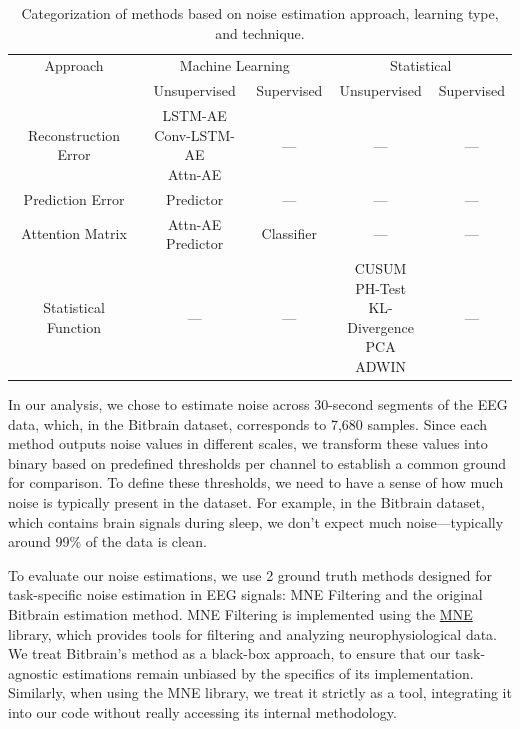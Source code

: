 \begin{table}[ht]
    \renewcommand{\arraystretch}{1.5}
    \setlength{\tabcolsep}{12pt}
    \centering
    \caption{Categorization of methods based on noise estimation approach, learning type, and technique.}
    \begin{tabular}{|c|c|c|c|c|}
    \hline
    Approach & \multicolumn{2}{c|}{Machine Learning} & \multicolumn{2}{c|}{Statistical} \\ \cline{2-5} 
             & Unsupervised & Supervised & Unsupervised & Supervised \\ \hline
    Reconstruction Error & \parbox[c][2cm][c]{2.3cm}{\raggedright LSTM-AE\\Conv-LSTM-AE\\Attn-AE} & --- & --- & --- \\ \hline
    Prediction Error     & Predictor & --- & --- & --- \\ \hline
    Attention Matrix     & \parbox[c][1.5cm][c]{2.3cm}{\raggedright Attn-AE\\Predictor} & Classifier & --- & --- \\ \hline
    Statistical Function & --- & --- & \parbox[c][3cm][c]{2.5cm}{\raggedright CUSUM\\PH-Test\\KL-Divergence\\PCA\\ADWIN} & --- \\ \hline
    \end{tabular}
    \label{table:framework-summary}
\end{table}

In our analysis, we chose to estimate noise across 30-second segments of the EEG data, which, in the Bitbrain dataset, corresponds to 7,680 samples. Since each method outputs noise values in different scales, we transform these values into binary based on predefined thresholds per channel to establish a common ground for comparison. To define these thresholds, we need to have a sense of how much noise is typically present in the dataset. For example, in the Bitbrain dataset, which contains brain signals during sleep, we don't expect much noise—typically around 99\% of the data is clean.

To evaluate our noise estimations, we use 2 ground truth methods designed for task-specific noise estimation in EEG signals: MNE Filtering and the original Bitbrain estimation method. MNE Filtering is implemented using the \href{https://mne.tools/stable/index.html}{MNE} library, which provides tools for filtering and analyzing neurophysiological data. We treat Bitbrain's method as a black-box approach, to ensure that our task-agnostic estimations remain unbiased by the specifics of its implementation. Similarly, when using the MNE library, we treat it strictly as a tool, integrating it into our code without really accessing its internal methodology.

